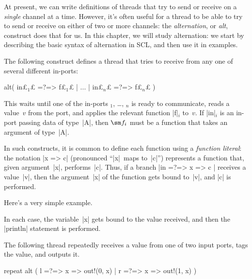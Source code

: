 At present, we can write definitions of threads that try to send or receive on
a \emph{single} channel at a time.  However, it's often useful for a thread to
be able to try to send or receive on either of two or more channels: the
\emph{alternation}, or \emph{alt}, construct does that for us.
%
In this chapter, we will study alternation: we start by describing the
basic syntax of alternation in SCL, and then use it in examples.


The following construct defines a thread that tries to receive from any one of
several different in-ports:
%
\begin{scala}
  alt( in£$_1$£ =?=> {f£$_1$£} | ... | in£$_n$£ =?=> {f£$_n$£} )
\end{scala}
%
This waits until one of the in-ports $_1$, \ldots, $_n$ is
ready to communicate, reads a value~$v$ from the port, and applies the
relevant function |f|$_i$ to~$v$.  If |in|$_i$ is an in-port passing data of
type~|A|, then $\sm f_i$ must be a function that takes an argument of
type~|A|.

In such constructs, it is common to define each function using a
\emph{function literal}: the notation |x => c| (pronounced ``|x|~maps
to~|c|'') represents a function that, given argument~|x|, performs~|c|.  Thus,
if a branch |in =?=> { x => c }| receives a value~|v|, then the argument~|x|
of the function gets bound to~|v|, and |c| is performed.

Here's a very simple example. 
%
%
In each case, the variable~|x| gets bound to the value received, and then the
|println| statement is performed. 


The following thread repeatedly receives a value from one of two input ports,
tags the value, and outputs it.
%
\begin{scala}
  repeat{
    alt ( l =?=> { x => out!(0, x) } | r =?=> { x => out!(1, x) } )
  }
\end{scala}

%

